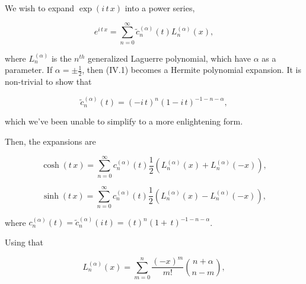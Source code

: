 \documentclass[amsmath,amssymb,floatfix]{revtex4}
\numberwithin{equation}{section}
\newcommand{\floor}[0]{ \textrm{fl} }
\begin{document}
\noindent 
We wish to expand $\exp{(i \, t \, x)}$ into a power series,

\begin{equation}
e^{i \, t \, x} = \sum _{n=0}^\infty \tilde{c}_n^{(\alpha)}(t) L_n^{(\alpha)}(x),
\end{equation}

\noindent where $L_n^{(\alpha)}$ is the $n^{th}$ generalized Laguerre polynomial, which have $\alpha$ as a parameter. If $\alpha = \pm \frac{1}{2}$, then (IV.1) becomes a Hermite polynomial expansion. It is non-trivial to show that


\begin{equation}
\tilde{c}_n^{(\alpha)}(t) = (-i \, t)^n (1-i \, t)^{-1-n-\alpha},
\end{equation}

\noindent 
which we've been unable to simplify to a more enlightening form.



Then, the expansions are 

\begin{equation}
\cosh{(t \, x)} = \sum _{n=0}^\infty {c}_n^{(\alpha)}(t) \frac{1}{2} \left( L_n^{(\alpha)}(x) + L_n^{(\alpha)}(-x) \right),
\end{equation}

\begin{equation}
\sinh{(t \, x)} = \sum _{n=0}^\infty {c}_n^{(\alpha)}(t) \frac{1}{2} \left( L_n^{(\alpha)}(x) - L_n^{(\alpha)}(-x) \right),
\end{equation}


\noindent
where  ${c}_n^{(\alpha)}(t) =   \tilde{c}_n^{(\alpha)}(i \, t) =  (t)^n (1+ \, t)^{-1-n-\alpha}$.

	Using that

\begin{equation}
	L_n^{(\alpha)}(x)= \sum_{m=0}^n \frac{(-x)^m }{m!}  \binom {n+\alpha} {n-m},
\end{equation}



\end{document}
